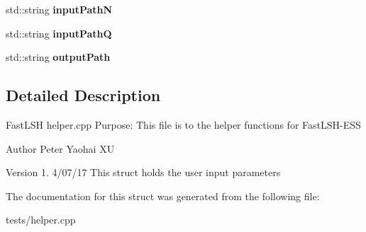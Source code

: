 \begin{DoxyCompactItemize}
\item 
std\+::string {\bfseries input\+PathN}\hypertarget{structargs_a040387ba2bc53890defeadf3fbe1ddfa}{}\label{structargs_a040387ba2bc53890defeadf3fbe1ddfa}

\item 
std\+::string {\bfseries input\+PathQ}\hypertarget{structargs_abb7c77e694951477fcb46c3eec2900e1}{}\label{structargs_abb7c77e694951477fcb46c3eec2900e1}

\item 
std\+::string {\bfseries output\+Path}\hypertarget{structargs_a05a63bd52a42ece9caa46b5a4ab2a367}{}\label{structargs_a05a63bd52a42ece9caa46b5a4ab2a367}

\end{DoxyCompactItemize}


\subsection{Detailed Description}
Fast\+L\+SH helper.\+cpp Purpose\+: This file is to the helper functions for Fast\+L\+S\+H-\/\+E\+SS

\begin{DoxyAuthor}{Author}
Peter Yaohai XU 
\end{DoxyAuthor}
\begin{DoxyVersion}{Version}
1. 4/07/17 This struct holds the user input parameters 
\end{DoxyVersion}


The documentation for this struct was generated from the following file\+:\begin{DoxyCompactItemize}
\item 
tests/helper.\+cpp\end{DoxyCompactItemize}
